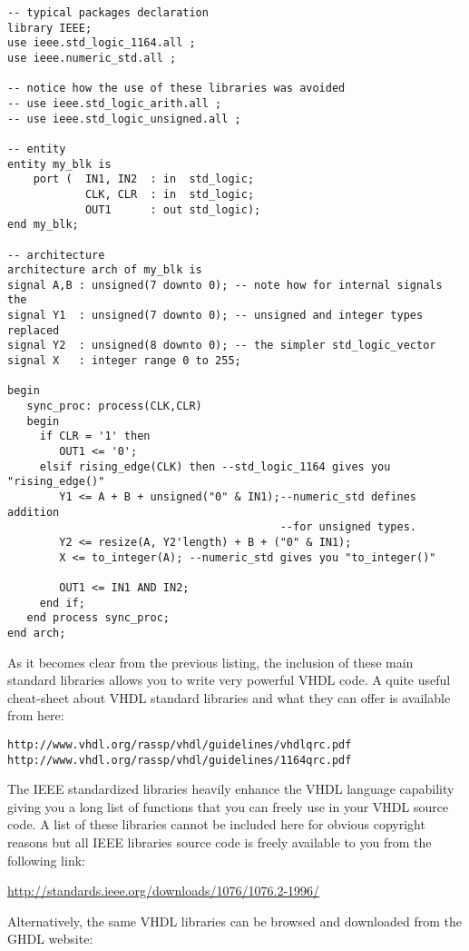 \begin{lstlisting}[label=good_lib_ex, caption=Example of operators and types available with some IEEE packages.]
-- typical packages declaration
library IEEE;
use ieee.std_logic_1164.all ;
use ieee.numeric_std.all ;

-- notice how the use of these libraries was avoided
-- use ieee.std_logic_arith.all ;
-- use ieee.std_logic_unsigned.all ;

-- entity
entity my_blk is 
    port (  IN1, IN2  : in  std_logic;
            CLK, CLR  : in  std_logic; 
            OUT1      : out std_logic); 
end my_blk;

-- architecture
architecture arch of my_blk is
signal A,B : unsigned(7 downto 0); -- note how for internal signals the
signal Y1  : unsigned(7 downto 0); -- unsigned and integer types replaced
signal Y2  : unsigned(8 downto 0); -- the simpler std_logic_vector
signal X   : integer range 0 to 255;

begin
   sync_proc: process(CLK,CLR)
   begin
     if CLR = '1' then 
        OUT1 <= '0';  
     elsif rising_edge(CLK) then --std_logic_1164 gives you "rising_edge()"
        Y1 <= A + B + unsigned("0" & IN1);--numeric_std defines addition
                                          --for unsigned types.
        Y2 <= resize(A, Y2'length) + B + ("0" & IN1);  
        X <= to_integer(A); --numeric_std gives you "to_integer()"

        OUT1 <= IN1 AND IN2; 
     end if; 
   end process sync_proc; 
end arch;
\end{lstlisting}
As it becomes clear from the previous listing, the inclusion of these main standard libraries allows you to write very powerful VHDL code. A quite useful cheat-sheet about VHDL standard libraries and what they can offer is available from here:
\begin{verbatim}
http://www.vhdl.org/rassp/vhdl/guidelines/vhdlqrc.pdf
http://www.vhdl.org/rassp/vhdl/guidelines/1164qrc.pdf
\end{verbatim}

The IEEE standardized libraries heavily enhance the VHDL language capability giving you a long list of functions that you can freely use in your VHDL source code. A list of these libraries cannot be included here for obvious copyright reasons but all IEEE libraries source code is freely available to you from the following link:

\url{http://standards.ieee.org/downloads/1076/1076.2-1996/}

Alternatively, the same VHDL libraries can be browsed and downloaded from the GHDL website:

